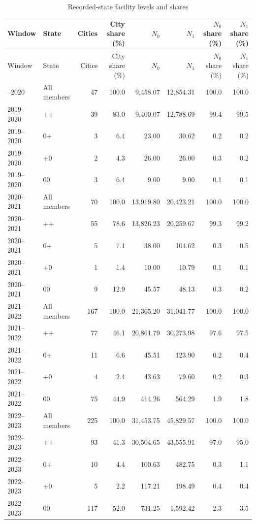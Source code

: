 \begingroup\scriptsize\setlength{\tabcolsep}{3pt}\begin{longtable}{@{}llrrrrrr@{}}\caption{Recorded-state facility levels and shares}\label{tab:record_state_details}\\\toprule
Window & State & Cities & City share (\%) & $N_0$ & $N_1$ & $N_0$ share (\%) & $N_1$ share (\%)\\
\midrule\endfirsthead\toprule
Window & State & Cities & City share (\%) & $N_0$ & $N_1$ & $N_0$ share (\%) & $N_1$ share (\%)\\
\midrule\endhead\bottomrule\endfoot
2019--2020 & All members & 47 & 100.0 & 9,458.07 & 12,854.31 & 100.0 & 100.0\\
2019--2020 & ++ & 39 & 83.0 & 9,400.07 & 12,788.69 & 99.4 & 99.5\\
2019--2020 & 0+ & 3 & 6.4 & 23.00 & 30.62 & 0.2 & 0.2\\
2019--2020 & +0 & 2 & 4.3 & 26.00 & 26.00 & 0.3 & 0.2\\
2019--2020 & 00 & 3 & 6.4 & 9.00 & 9.00 & 0.1 & 0.1\\
2020--2021 & All members & 70 & 100.0 & 13,919.80 & 20,423.21 & 100.0 & 100.0\\
2020--2021 & ++ & 55 & 78.6 & 13,826.23 & 20,259.67 & 99.3 & 99.2\\
2020--2021 & 0+ & 5 & 7.1 & 38.00 & 104.62 & 0.3 & 0.5\\
2020--2021 & +0 & 1 & 1.4 & 10.00 & 10.79 & 0.1 & 0.1\\
2020--2021 & 00 & 9 & 12.9 & 45.57 & 48.13 & 0.3 & 0.2\\
2021--2022 & All members & 167 & 100.0 & 21,365.20 & 31,041.77 & 100.0 & 100.0\\
2021--2022 & ++ & 77 & 46.1 & 20,861.79 & 30,273.98 & 97.6 & 97.5\\
2021--2022 & 0+ & 11 & 6.6 & 45.51 & 123.90 & 0.2 & 0.4\\
2021--2022 & +0 & 4 & 2.4 & 43.63 & 79.60 & 0.2 & 0.3\\
2021--2022 & 00 & 75 & 44.9 & 414.26 & 564.29 & 1.9 & 1.8\\
2022--2023 & All members & 225 & 100.0 & 31,453.75 & 45,829.57 & 100.0 & 100.0\\
2022--2023 & ++ & 93 & 41.3 & 30,504.65 & 43,555.91 & 97.0 & 95.0\\
2022--2023 & 0+ & 10 & 4.4 & 100.63 & 482.75 & 0.3 & 1.1\\
2022--2023 & +0 & 5 & 2.2 & 117.21 & 198.49 & 0.4 & 0.4\\
2022--2023 & 00 & 117 & 52.0 & 731.25 & 1,592.42 & 2.3 & 3.5\\
\end{longtable}
